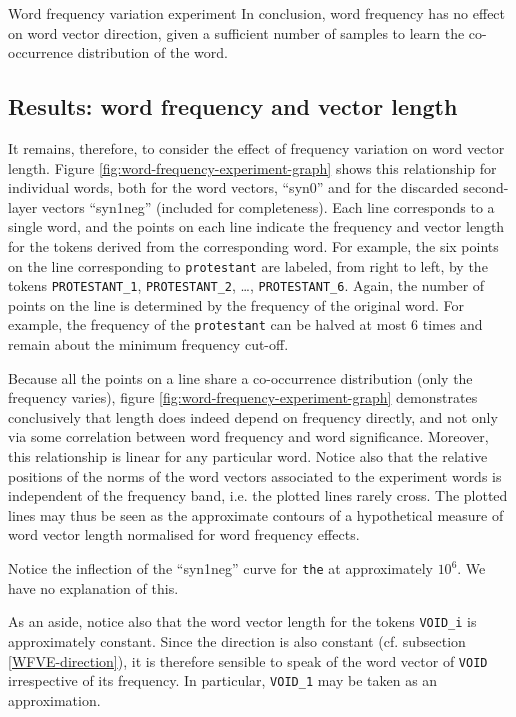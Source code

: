\documentclass{article} %
\newcommand{\word}[1]{\texttt{#1}}
\begin{document}
\begin{section}{Word frequency variation experiment}
In conclusion, word frequency has no effect on word vector direction, given a sufficient number of samples to learn the co-occurrence distribution of the word.

\subsection{Results: word frequency and vector length}
It remains, therefore, to consider the effect of frequency variation on word vector length.
Figure \ref{fig:word-frequency-experiment-graph} shows this relationship for individual words, both for the word vectors, ``syn0'' and for the discarded second-layer vectors ``syn1neg'' (included for completeness).
Each line corresponds to a single word, and the points on each line indicate the frequency and vector length for the tokens derived from the corresponding word.
For example, the six points on the line corresponding to \word{protestant} are labeled, from right to left, by the tokens \word{PROTESTANT\_1}, \word{PROTESTANT\_2}, \dots, \word{PROTESTANT\_6}.
Again, the number of points on the line is determined by the frequency of the original word.
For example, the frequency of the \word{protestant} can be halved at most $6$ times and remain about the minimum frequency cut-off.

Because all the points on a line share a co-occurrence distribution (only the frequency varies), figure \ref{fig:word-frequency-experiment-graph} demonstrates conclusively that length does indeed depend on frequency directly, and not only via some correlation between word frequency and word significance.
Moreover, this relationship is linear for any particular word.
Notice also that the relative positions of the norms of the word vectors associated to the experiment words is independent of the frequency band, i.e. the plotted lines rarely cross.
The plotted lines may thus be seen as the approximate contours of a hypothetical measure of word vector length normalised for word frequency effects.

Notice the inflection of the ``syn1neg'' curve for \word{the} at approximately $10^6$.  We have no explanation of this.

As an aside, notice also that the word vector length for the tokens \word{VOID\_i} is approximately constant.
Since the direction is also constant (cf. subsection \ref{WFVE-direction}), it is therefore sensible to speak of the word vector of \word{VOID} irrespective of its frequency.
In particular, \word{VOID\_1} may be taken as an approximation.


\end{section}
\end{document}
